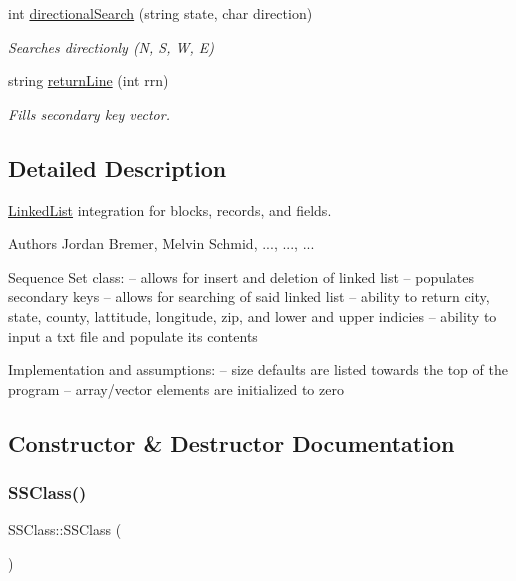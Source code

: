 \begin{DoxyCompactItemize}
int \hyperlink{classSSClass_ad03c99840c2946a2112f5f1942c287f2}{directional\+Search} (string state, char direction)
\begin{DoxyCompactList}\small\item\em Searches directionly (N, S, W, E) \end{DoxyCompactList}\item 
string \hyperlink{classSSClass_ab0a8ea1af895df28359b5733bd920ef3}{return\+Line} (int rrn)
\begin{DoxyCompactList}\small\item\em Fills secondary key vector. \end{DoxyCompactList}\end{DoxyCompactItemize}


\subsection{Detailed Description}
\hyperlink{classLinkedList}{Linked\+List} integration for blocks, records, and fields. 

\begin{DoxyAuthor}{Authors}
Jordan Bremer, Melvin Schmid, ..., ..., ...
\end{DoxyAuthor}
Sequence Set class\+: -- allows for insert and deletion of linked list -- populates secondary keys -- allows for searching of said linked list -- ability to return city, state, county, lattitude, longitude, zip, and lower and upper indicies -- ability to input a txt file and populate it\textquotesingle{}s contents

Implementation and assumptions\+: -- size defaults are listed towards the top of the program -- array/vector elements are initialized to zero 

\subsection{Constructor \& Destructor Documentation}
\mbox{\label{classSSClass_ab4603d6a236c4fa65f896a1158c0d2ef}} 
\subsubsection{\texorpdfstring{S\+S\+Class()}{SSClass()}\hspace{0.1cm}{\footnotesize\ttfamily [1/2]}}
{\footnotesize\ttfamily S\+S\+Class\+::\+S\+S\+Class (\begin{DoxyParamCaption}{ }\end{DoxyParamCaption})}



